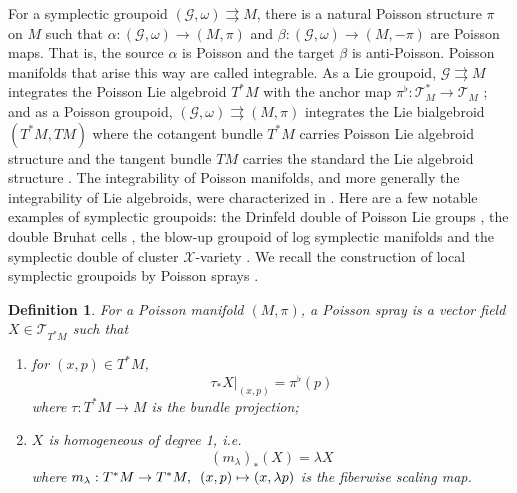 \documentclass{amsart}
\newtheorem{definition}[theorem]{Definition}
\newcommand{\cG}{\mathcal{G}}
\newcommand{\cX}{\mathcal{X}}
\newcommand{\cT}{\mathcal{T}}
\newcommand{\rra}{\rightrightarrows}
\begin{document}
For a symplectic groupoid $(\cG, \omega) \rra M$, there is a natural Poisson structure $\pi$ on $M$ such that $\alpha: (\cG, \omega) \to (M, \pi)$ and $\beta: (\cG, \omega) \to (M, -\pi)$ are Poisson maps. That is, the source $\alpha$ is Poisson and the target $\beta$ is anti-Poisson. Poisson manifolds that arise this way are called integrable. As a Lie groupoid, $\cG \rra M$ integrates the Poisson Lie algebroid $T^*M$ with the anchor map $\pi^\flat: \cT^*_M \to \cT_M$ \cite{MR866024}; and as a Poisson groupoid, $(\cG, \omega) \rra (M, \pi)$ integrates the Lie bialgebroid $(T^*M, TM)$ where the cotangent bundle $T^*M$ carries Poisson Lie algebroid structure and the tangent bundle $TM$ carries the standard the Lie algebroid structure \cite{MR1262213}. The integrability of Poisson manifolds, and more generally the integrability of Lie algebroids, were characterized in \cite{MR1973056, MR2128714}. Here are a few notable examples of symplectic groupoids: the Drinfeld double of Poisson Lie groups \cite{MR1054741}, the double Bruhat cells \cite{LuM16}, the blow-up groupoid of log symplectic manifolds \cite{MR3214314} and the symplectic double of cluster $\cX$-variety \cite{MR2470108}. We recall the construction of local symplectic groupoids by Poisson sprays \cite{MR2900786, CMS17}.

\begin{definition}
For a Poisson manifold $(M, \pi)$, a Poisson spray is a vector field $X \in \cT_{T^*M}$ such that
	\begin{enumerate}
		\item for $(x,p) \in T^*M$,
			$$
				\tau_* X|_{(x,p)} = \pi^\flat(p)
			$$
			where $\tau: T^*M \to M$ is the bundle projection;
		\item
			$X$ is homogeneous of degree 1, i.e.
			$$
				(m_\lambda)_*(X) = \lambda X 
			$$
			where $m_\lambda: T^*M \to T^*M, \enskip (x,p) \mapsto (x,\lambda p)$ is the fiberwise scaling map.
	\end{enumerate}
\end{definition}
\end{document}
